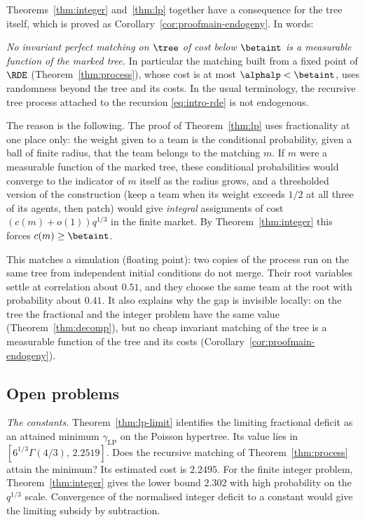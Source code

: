 Theorems~\ref{thm:integer} and~\ref{thm:lp} together have a consequence for the tree itself,
which is proved as Corollary~\ref{cor:proofmain-endogeny}. In words:

\emph{No invariant perfect matching on $\tree$ of cost below $\betaint$ is a measurable
function of the marked tree.} In particular the matching built from a fixed point of $\RDE$
(Theorem~\ref{thm:process}), whose cost is at most $\alphalp<\betaint$, uses randomness
beyond the tree and its costs. In the usual terminology, the recursive tree process attached
to the recursion \eqref{eq:intro-rde} is not endogenous.

The reason is the following. The proof of Theorem~\ref{thm:lp} uses fractionality at one
place only: the weight given to a team is the conditional probability, given a ball of
finite radius, that the team belongs to the matching $m$. If $m$ were a measurable function
of the marked tree, these conditional probabilities would converge to the indicator of $m$
itself as the radius grows, and a thresholded version of the construction (keep a team when
its weight exceeds $1/2$ at all three of its agents, then patch) would give \emph{integral}
assignments of cost $(c(m)+o(1))q^{1/3}$ in the finite market. By
Theorem~\ref{thm:integer} this forces $c(m)\ge\betaint$.

This matches a simulation (floating point): two copies of the process run on the same tree
from independent initial conditions do not merge. Their root variables settle at correlation
about $0.51$, and they choose the same team at the root with probability about $0.41$. It
also explains why the gap is invisible locally: on the tree the fractional and the integer
problem have the same value (Theorem~\ref{thm:decomp}), but no cheap invariant matching of
the tree is a measurable function of the tree and its costs
(Corollary~\ref{cor:proofmain-endogeny}).

\subsection{Open problems}\label{sec:discussion-open}

\emph{The constants.}
Theorem~\ref{thm:lp-limit} identifies the limiting fractional deficit as an attained
minimum $\gamma_{\mathrm{LP}}$ on the Poisson hypertree. Its value lies in
$[6^{1/3}\Gamma(4/3),\,2.2519]$. Does the recursive matching of
Theorem~\ref{thm:process} attain the minimum? Its estimated cost is $2.2495$.
For the finite integer problem, Theorem~\ref{thm:integer} gives the lower bound
$2.302$ with high probability on the $q^{1/3}$ scale. Convergence of the normalised
integer deficit to a constant would give the limiting subsidy by subtraction.

